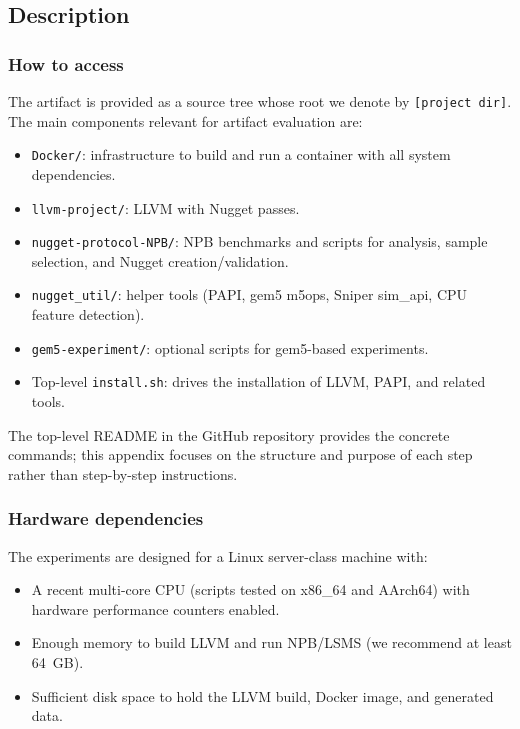 \subsection{Description}

\subsubsection{How to access}

The artifact is provided as a source tree whose root we denote by \texttt{[project dir]}. The main components relevant for artifact evaluation are:
\begin{itemize}
  \item \texttt{Docker/}: infrastructure to build and run a container with all system dependencies.
  \item \texttt{llvm-project/}: LLVM with Nugget passes.
  \item \texttt{nugget-protocol-NPB/}: NPB benchmarks and scripts for analysis, sample selection, and Nugget creation/validation.
  \item \texttt{nugget\_util/}: helper tools (PAPI, gem5 m5ops, Sniper sim\_api, CPU feature detection).
  \item \texttt{gem5-experiment/}: optional scripts for gem5-based experiments.
  \item Top-level \texttt{install.sh}: drives the installation of LLVM, PAPI, and related tools.
\end{itemize}

The top-level README in the GitHub repository provides the concrete commands; this appendix focuses on the structure and purpose of each step rather than step-by-step instructions.

\subsubsection{Hardware dependencies}

The experiments are designed for a Linux server-class machine with:
\begin{itemize}
  \item A recent multi-core CPU (scripts tested on x86\_64 and AArch64) with hardware performance counters enabled.
  \item Enough memory to build LLVM and run NPB/LSMS (we recommend at least 64~GB).
  \item Sufficient disk space to hold the LLVM build, Docker image, and generated data.
\end{itemize}

